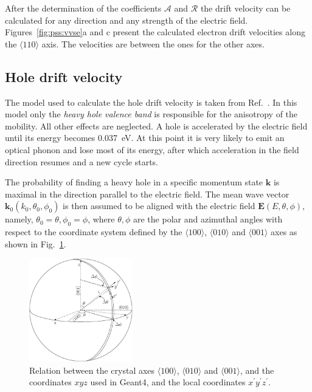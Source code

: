 After the determination of the coefficients $\mathcal{A}$ and
$\mathcal{R}$ the drift velocity can be calculated for any direction
and any strength of the electric field. Figures~\ref{fig:pss:vvse}a
and c present the calculated electron drift velocities along the
$\langle 110 \rangle$ axis. The velocities are between the ones for
the other axes.

 
\subsection{Hole drift velocity} 
\label{sec:pss:hole} 
The model used to calculate the hole drift velocity is taken from
Ref.~\cite{bart}. In this model only the \emph{heavy hole valence
band} is responsible for the anisotropy of the mobility. All other
effects are neglected. A hole is accelerated by the electric field
until its energy becomes 0.037~eV. At this point it is very likely to
emit an optical phonon and lose most of its energy, after which
acceleration in the field direction resumes and a new cycle starts.
 
The probability of finding a heavy hole in a specific momentum state
$\mathbf{k}$ is maximal in the direction parallel to the electric
field. The mean wave vector $\mathbf{k}_{0}(k_{0}, \theta_{0},
\phi_{0})$ is then assumed to be aligned with the electric field
$\mathbf{E}(E, \theta, \phi)$, namely, $\theta_{0} = \theta, \phi_{0}
= \phi$, where $\theta, \phi$ are the polar and azimuthal angles with
respect to the coordinate system defined by the $\langle 100 \rangle$,
$\langle 010 \rangle$ and $\langle 001 \rangle$ axes as shown in
Fig.~\ref{fig:pss:vsphere}.
 
\begin{figure} 
\centering 
\includegraphics[width=0.4\textwidth]{vsphere}   
\caption{Relation between the crystal axes $\langle100\rangle$,
$\langle010\rangle$ and $\langle001\rangle$, and the coordinates $xyz$
used in Geant4, and the local coordinates
$x^{\prime}y^{\prime}z^{\prime}$.}
\label{fig:pss:vsphere} 
\end{figure} 
 
